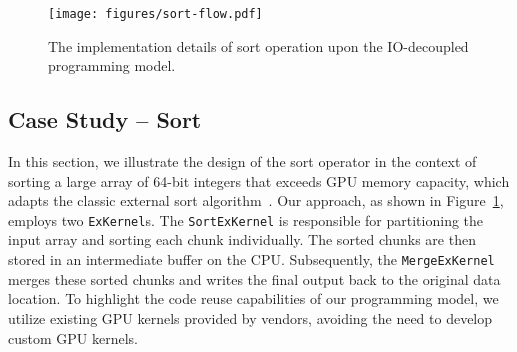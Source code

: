 




\begin{figure}[t]
    \centering
    \texttt{[image: figures/sort-flow.pdf]}
    \caption{The implementation details of sort operation upon the IO-decoupled programming model.}
    \label{fig:sort-flow}
\end{figure}

\subsection{Case Study -- Sort}
\label{sec:design-sort}
In this section, we illustrate the design of the sort operator in the context of sorting a large array of 64-bit integers that exceeds GPU memory capacity, which adapts the classic external sort algorithm~\cite{external-sort}.
Our approach, as shown in Figure~\ref{fig:sort-flow}, employs two \texttt{ExKernel}s. 
The \texttt{SortExKernel} is responsible for partitioning the input array and sorting each chunk individually. 
The sorted chunks are then stored in an intermediate buffer on the CPU. 
Subsequently, the \texttt{MergeExKernel} merges these sorted chunks and writes the final output back to the original data location. 
To highlight the code reuse capabilities of our programming model, we utilize existing GPU kernels provided by vendors, avoiding the need to develop custom GPU kernels.

